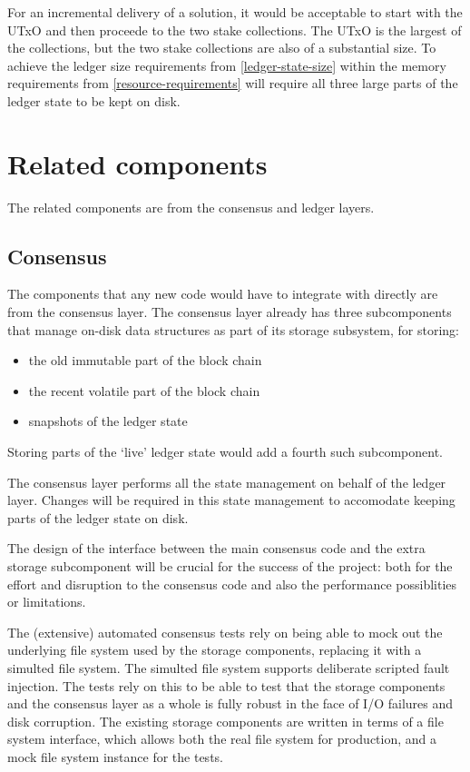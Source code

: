 \documentclass[11pt,a4paper]{article}
\begin{document}
For an incremental delivery of a solution, it would be acceptable to start with
the UTxO and then proceede to the two stake collections. The UTxO is the largest
of the collections, but the two stake collections are also of a substantial
size. To achieve the ledger size requirements from \cref{ledger-state-size}
within the memory requirements from \cref{resource-requirements} will require
all three large parts of the ledger state to be kept on disk.

\section{Related components}
\label{components}

The related components are from the consensus and ledger layers.

\subsection{Consensus}

The components that any new code would have to integrate with directly are from
the consensus layer. The consensus layer already has three subcomponents that
manage on-disk data structures as part of its storage subsystem, for storing:
\begin{itemize}
\item the old immutable part of the block chain
\item the recent volatile part of the block chain
\item snapshots of the ledger state
\end{itemize}
Storing parts of the `live' ledger state would add a fourth such subcomponent.

The consensus layer performs all the state management on behalf of the ledger
layer. Changes will be required in this state management to accomodate keeping
parts of the ledger state on disk.

The design of the interface between the main consensus code and the extra
storage subcomponent will be crucial for the success of the project: both for
the effort and disruption to the consensus code and also the performance
possiblities or limitations.

The (extensive) automated consensus tests rely on being able to mock out the
underlying file system used by the storage components, replacing it with a
simulted file system. The simulted file system supports deliberate scripted
fault injection. The tests rely on this to be able to test that the storage
components and the consensus layer as a whole is fully robust in the face of
I/O failures and disk corruption. The existing storage components are written
in terms of a file system interface, which allows both the real file system for
production, and a mock file system instance for the tests.
\end{document}

